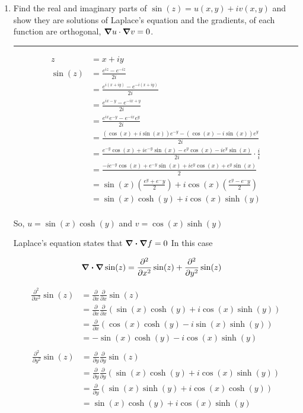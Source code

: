 \documentclass[12pt, oneside]{article}
\newenvironment{answer}
  {\vspace*{0.2cm} \rule{12cm}{0.02cm} \vspace*{0.2cm}}
  {\vspace*{0.2cm}}
\begin{document}
\begin{enumerate}
  \item Find the real and imaginary parts of $\sin(z) = u(x,y) + iv(x,y)$ and show they are solutions of Laplace’s equation and the gradients, of each function are orthogonal, $\gradient u \cdot \gradient v = 0$.

  \begin{answer}
    \begin{align*}
      z &= x + iy\\
      \sin(z) &= \frac{e^{iz}-e^{-iz}}{2i}\\
      &= \frac{e^{i(x+iy)}-e^{-i(x+iy)}}{2i}\\
      &= \frac{e^{ix-y}-e^{-ix+y}}{2i}\\
      &= \frac{e^{ix}e^{-y}-e^{-ix}e^{y}}{2i}\\
      &= \frac{(\cos(x)+i\sin(x))e^{-y}-(\cos(x)-i\sin(x))e^{y}}{2i}\\
      &= \frac{e^{-y}\cos(x)+ie^{-y}\sin(x)-e^{y}\cos(x)-ie^{y}\sin(x)}{2i}\cdot\frac{i}{i}\\
      &= \frac{-ie^{-y}\cos(x)+e^{-y}\sin(x)+ie^{y}\cos(x)+e^{y}\sin(x)}{2}\\
      &= \sin(x)(\frac{e^y + e^-y}{2}) + i\cos(x)(\frac{e^y - e^-y}{2})\\
      &= \sin(x)\cosh(y) + i\cos(x)\sinh(y)\\
    \end{align*}

    So, $u = \sin(x)\cosh(y)$ and $v = \cos(x)\sinh(y)$\label{breakdown}

    Laplace's equation states that $\divergence \gradient f = 0$ In this case

    \begin{align*}
      \divergence \gradient \sin(z) &= \frac{\partial^2}{\partial x^2}\sin(z) + \frac{\partial^2}{\partial y^2}\sin(z)
    \end{align*}

    \begin{align*}
      \frac{\partial^2}{\partial x^2}\sin(z) &= \frac{\partial}{\partial x}\frac{\partial}{\partial x}\sin(z)\\
      &= \frac{\partial}{\partial x}\frac{\partial}{\partial x}(\sin(x)\cosh(y) + i\cos(x)\sinh(y))\\
      &= \frac{\partial}{\partial x}(\cos(x)\cosh(y) - i\sin(x)\sinh(y))\\
      &= -\sin(x)\cosh(y) - i\cos(x)\sinh(y)\\
    \end{align*}
    \begin{align*}
      \frac{\partial^2}{\partial y^2}\sin(z) &= \frac{\partial}{\partial y}\frac{\partial}{\partial y}\sin(z)\\
      &= \frac{\partial}{\partial y}\frac{\partial}{\partial y}(\sin(x)\cosh(y) + i\cos(x)\sinh(y))\\
      &= \frac{\partial}{\partial y}(\sin(x)\sinh(y) + i\cos(x)\cosh(y))\\
      &= \sin(x)\cosh(y) + i\cos(x)\sinh(y)\\
    \end{align*}


\end{answer}
\end{enumerate}
\end{document}
